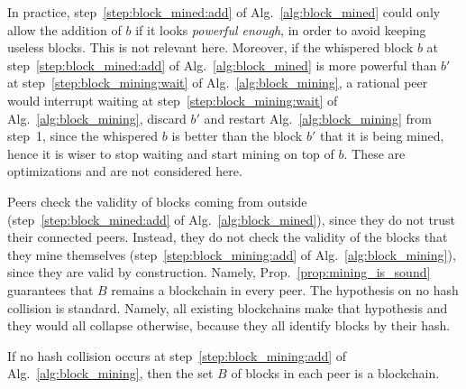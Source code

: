 %
In practice, step~\ref{step:block_mined:add} of Alg.~\ref{alg:block_mined} could
only allow the addition of $b$ if it looks \emph{powerful enough},
in order to avoid keeping useless blocks. This is not relevant here.
Moreover, if the whispered block $b$
at step~\ref{step:block_mined:add} of Alg.~\ref{alg:block_mined} is more
powerful than $b'$ at step~\ref{step:block_mining:wait} of Alg.~\ref{alg:block_mining},
a rational peer would interrupt waiting at step~\ref{step:block_mining:wait}
of Alg.~\ref{alg:block_mining}, discard $b'$ and restart Alg.~\ref{alg:block_mining}
from step~1, since the whispered $b$ is better than the block $b'$ that it is being mined,
hence it is wiser to stop waiting and start mining on top of $b$.
These are optimizations and are not considered here.

Peers check the validity of blocks coming from outside
(step~\ref{step:block_mined:add} of Alg.~\ref{alg:block_mined}), since they do not trust
their connected peers. Instead, they do not check the validity of the blocks that they
mine themselves (step~\ref{step:block_mining:add} of Alg.~\ref{alg:block_mining}),
since they are valid by construction. Namely,
Prop.~\ref{prop:mining_is_sound} guarantees that $B$ remains a blockchain in every peer.
The hypothesis on no hash collision is standard. Namely, all existing
blockchains make that hypothesis and they would all collapse otherwise,
because they all identify blocks by their hash.
%
\begin{proposition}\label{prop:mining_is_sound}
  If no hash collision occurs at step~\ref{step:block_mining:add} of Alg.~\ref{alg:block_mining},
  then the set $B$ of blocks in each peer is a blockchain.
\end{proposition}
